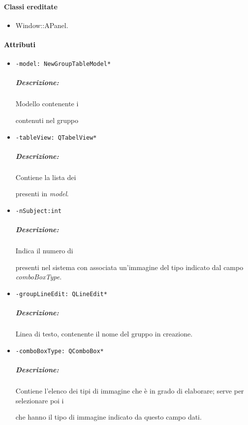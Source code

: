 \paragraph{Classi ereditate\\}
\begin{itemize}
\item Window::APanel.
\end{itemize}
\paragraph{\textcolor{black}{Attributi\\}}
\begin{itemize}
\item \color{teal}\verb!-model: NewGroupTableModel* !
\color{black}
\subparagraph{Descrizione:}
Modello contenente i \subject{} contenuti nel gruppo 
\item \color{teal}\verb!-tableView: QTabelView* !
\color{black}
\subparagraph{Descrizione:}
Contiene la lista dei \subject{} presenti in \emph{model}.

\item\color{teal}\verb!-nSubject:int !
\color{black}
\subparagraph{Descrizione:}
Indica il numero di \subject{} presenti nel sistema con associata un'immagine del tipo indicato dal campo \emph{comboBoxType}.


\item \color{teal}\verb!-groupLineEdit: QLineEdit* !
\color{black}
\subparagraph{Descrizione:}
Linea di testo, contenente il nome del gruppo in creazione.

\item \color{teal}\verb!-comboBoxType: QComboBox* !
\color{black}
\subparagraph{Descrizione:}
Contiene l'elenco dei tipi di immagine che \project è in grado di elaborare; serve per selezionare poi i \subject{} che hanno il tipo di immagine indicato da questo campo dati.
\end{itemize}
